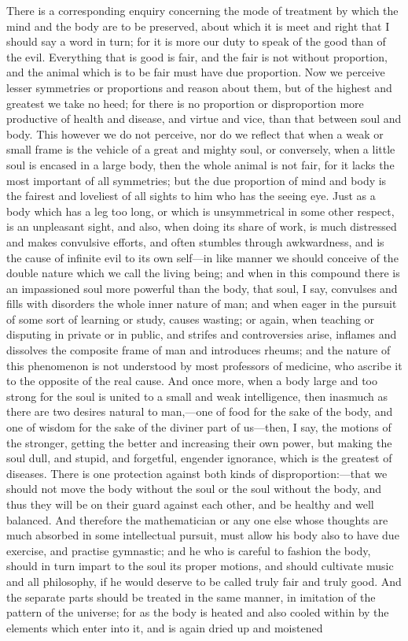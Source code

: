 \documentclass[11pt,letter]{article}
\begin{document}
\par  There is a corresponding enquiry concerning the mode of treatment by which the mind and the body are to be preserved, about which it is meet and right that I should say a word in turn; for it is more our duty to speak of the good than of the evil. Everything that is good is fair, and the fair is not without proportion, and the animal which is to be fair must have due proportion. Now we perceive lesser symmetries or proportions and reason about them, but of the highest and greatest we take no heed; for there is no proportion or disproportion more productive of health and disease, and virtue and vice, than that between soul and body. This however we do not perceive, nor do we reflect that when a weak or small frame is the vehicle of a great and mighty soul, or conversely, when a little soul is encased in a large body, then the whole animal is not fair, for it lacks the most important of all symmetries; but the due proportion of mind and body is the fairest and loveliest of all sights to him who has the seeing eye. Just as a body which has a leg too long, or which is unsymmetrical in some other respect, is an unpleasant sight, and also, when doing its share of work, is much distressed and makes convulsive efforts, and often stumbles through awkwardness, and is the cause of infinite evil to its own self—in like manner we should conceive of the double nature which we call the living being; and when in this compound there is an impassioned soul more powerful than the body, that soul, I say, convulses and fills with disorders the whole inner nature of man; and when eager in the pursuit of some sort of learning or study, causes wasting; or again, when teaching or disputing in private or in public, and strifes and controversies arise, inflames and dissolves the composite frame of man and introduces rheums; and the nature of this phenomenon is not understood by most professors of medicine, who ascribe it to the opposite of the real cause. And once more, when a body large and too strong for the soul is united to a small and weak intelligence, then inasmuch as there are two desires natural to man,—one of food for the sake of the body, and one of wisdom for the sake of the diviner part of us—then, I say, the motions of the stronger, getting the better and increasing their own power, but making the soul dull, and stupid, and forgetful, engender ignorance, which is the greatest of diseases. There is one protection against both kinds of disproportion:—that we should not move the body without the soul or the soul without the body, and thus they will be on their guard against each other, and be healthy and well balanced. And therefore the mathematician or any one else whose thoughts are much absorbed in some intellectual pursuit, must allow his body also to have due exercise, and practise gymnastic; and he who is careful to fashion the body, should in turn impart to the soul its proper motions, and should cultivate music and all philosophy, if he would deserve to be called truly fair and truly good. And the separate parts should be treated in the same manner, in imitation of the pattern of the universe; for as the body is heated and also cooled within by the elements which enter into it, and is again dried up and moistened 
\end{document}
